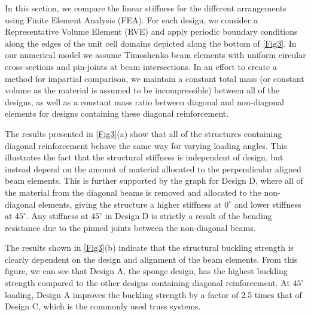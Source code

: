 \documentclass[9pt,twocolumn,twoside]{fernandes_paper}
\begin{document}
In this section, we compare the linear stiffness for the different arrangements using Finite Element Analysis (FEA). For each design, we consider a Representative Volume Element (RVE) and apply periodic boundary conditions along the edges of the unit cell domains depicted along the bottom of \cref{Fig3}. In our numerical model we assume Timoshenko beam elements with uniform circular cross-sections and pin-joints at beam intersections. In an effort to create a method for impartial comparison, we maintain a constant total mass (or constant volume as the material is assumed to be incompressible) between all of the designs, as well as a constant mass ratio between diagonal and non-diagonal elements for designs containing these diagonal reinforcement. 

The results presented in \cref{Fig3}(a) show that all of the structures containing diagonal reinforcement behave the same way for varying loading angles. This illustrates the fact that the structural stiffness is independent of design, but instead depend on the amount of material allocated to the perpendicular aligned beam elements. This is further supported by the graph for Design D, where all of the material from the diagonal beams is removed and allocated to the non-diagonal elements, giving the structure a higher stiffness at $0^\circ$ and lower stiffness at $45^\circ$. Any stiffness at $45^\circ$ in Design D is strictly a result of the bending resistance due to the pinned joints between the non-diagonal beams.

The results shown in \cref{Fig3}(b) indicate that the structural buckling strength is clearly dependent on the design and alignment of the beam elements. From this figure, we can see that Design A, the sponge design, has the highest buckling strength compared to the other designs containing diagonal reinforcement. At $45^\circ$ loading, Design A improves the buckling strength by a factor of 2.5 times that of Design C, which is the commonly used truss systems. 
\end{document}
